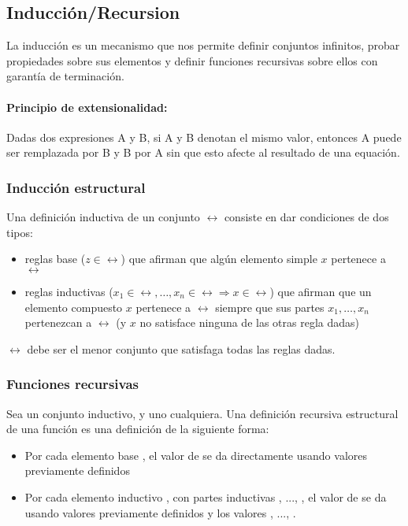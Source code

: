\subsection{Inducción/Recursion}

La inducción es un mecanismo que nos permite definir conjuntos infinitos, probar propiedades sobre sus elementos y definir funciones recursivas sobre ellos con garantía de terminación.

\paragraph{Principio de extensionalidad:} Dadas dos expresiones A y B, si A y B denotan el mismo valor, entonces A puede ser remplazada por B y B por A sin que esto afecte al resultado de una equación.

\subsubsection{Inducción estructural}
Una definición inductiva de un conjunto $\rel$ consiste en dar condiciones de dos tipos:
\begin{itemize}
	\item reglas base ($z\in\rel$) que afirman que algún elemento simple $x$ pertenece a $\rel$
	\item reglas inductivas ($x_1\in\rel,\dots,x_n\in\rel\Rightarrow x\in\rel$) que afirman que un elemento compuesto $x$ pertenece a
	$\rel$ siempre que sus partes $x_1,\dots,x_n$ pertenezcan a $\rel$
	(y $x$ no satisface ninguna de las otras regla dadas)
\end{itemize}

$\rel$ debe ser el menor conjunto que satisfaga todas las reglas dadas.

\subsubsection{Funciones recursivas}
Sea  un conjunto inductivo, y  uno cualquiera. Una definición recursiva estructural de una función  es una definición de la siguiente forma:
\begin{itemize}
	\item Por cada elemento base , el valor de  se da directamente usando valores previamente definidos
	\item Por cada elemento inductivo , con partes inductivas , ..., , el valor de  se da usando valores previamente definidos y los valores , ..., .
\end{itemize}


